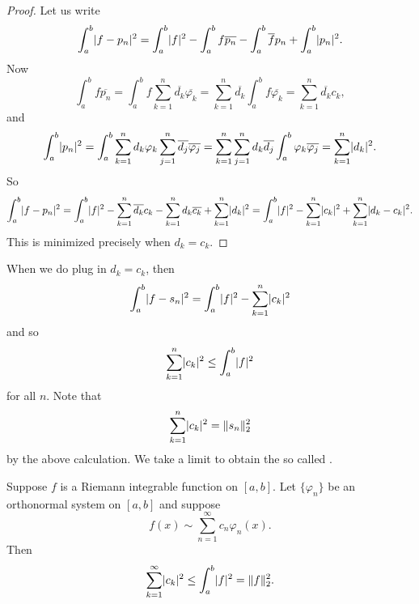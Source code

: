 \begin{proof}
Let us write
\begin{equation*}
\int_a^b \lvert {f-p_n} \rvert^2
=
\int_a^b \lvert {f} \rvert^2
-
\int_a^b f \overline{p_n}
-
\int_a^b \overline{f} p_n
+
\int_a^b \lvert {p_n} \rvert^2 .
\end{equation*}
Now
\begin{equation*}
\int_a^b f \overline{p_n}
=
\int_a^b f \sum_{k=1}^n \overline{d_k} \overline{\varphi_k}
=
 \sum_{k=1}^n \overline{d_k} \int_a^b f \overline{\varphi_k}
=
 \sum_{k=1}^n \overline{d_k} c_k ,
\end{equation*}
and
\begin{equation*}
\int_a^b \lvert {p_n} \rvert^2
=
\int_a^b
\sum_{k=1}^n d_k \varphi_k
\sum_{j=1}^n \overline{d_j} \overline{\varphi_j}
=
\sum_{k=1}^n
\sum_{j=1}^n 
d_k
\overline{d_j} 
\int_a^b
\varphi_k
\overline{\varphi_j}
=
\sum_{k=1}^n
\lvert {d_k} \rvert^2 .
\end{equation*}
So
\begin{equation*}
\int_a^b \lvert {f-p_n} \rvert^2
=
\int_a^b \lvert {f} \rvert^2
-
\sum_{k=1}^n \overline{d_k} c_k
-
\sum_{k=1}^n d_k \overline{c_k}
+
\sum_{k=1}^n
\lvert {d_k} \rvert^2
=
\int_a^b \lvert {f} \rvert^2
-
\sum_{k=1}^n \lvert {c_k} \rvert^2
+
\sum_{k=1}^n
\lvert {d_k-c_k} \rvert^2 .
\end{equation*}
This is minimized precisely when $d_k = c_k$.
\end{proof}

When we do plug in $d_k = c_k$, then
\begin{equation*}
\int_a^b \lvert {f-s_n} \rvert^2
=
\int_a^b \lvert {f} \rvert^2
-
\sum_{k=1}^n \lvert {c_k} \rvert^2
\end{equation*}
and so
\begin{equation*}
\sum_{k=1}^n \lvert {c_k} \rvert^2
\leq
\int_a^b \lvert {f} \rvert^2
\end{equation*}
for all $n$.  Note that
\begin{equation*}
\sum_{k=1}^n \lvert {c_k} \rvert^2 = \lVert {s_n} \rVert_2^2
\end{equation*}
by the above calculation.
We take a limit to obtain the so called
\emph{}.

\begin{thm} \label{thm:bessels}
Suppose $f$ is a Riemann integrable function on $[a,b]$.
Let $\{ \varphi_n \}$ be an orthonormal system on $[a,b]$ and
suppose
\begin{equation*}
f(x) \sim \sum_{n=1}^\infty c_n \varphi_n(x) .
\end{equation*}
Then
\begin{equation*}
\sum_{k=1}^\infty \lvert {c_k} \rvert^2
\leq
\int_a^b \lvert {f} \rvert^2
= \lVert {f} \rVert_2^2 .
\end{equation*}
\end{thm}


